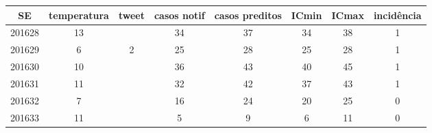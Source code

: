 \begin{tabular}{c|ccccccc}
  \hline
SE & temperatura & tweet & casos notif & casos preditos & ICmin & ICmax & incidência \\ 
  \hline
201628 & 13 &  & 34 & 37 & 34 & 38 & 1 \\ 
  201629 & 6 & 2 & 25 & 28 & 25 & 28 & 1 \\ 
  201630 & 10 &  & 36 & 43 & 40 & 45 & 1 \\ 
  201631 & 11 &  & 32 & 42 & 37 & 43 & 1 \\ 
  201632 & 7 &  & 16 & 24 & 20 & 25 & 0 \\ 
  201633 & 11 &  & 5 & 9 & 6 & 11 & 0 \\ 
   \hline
\end{tabular}
